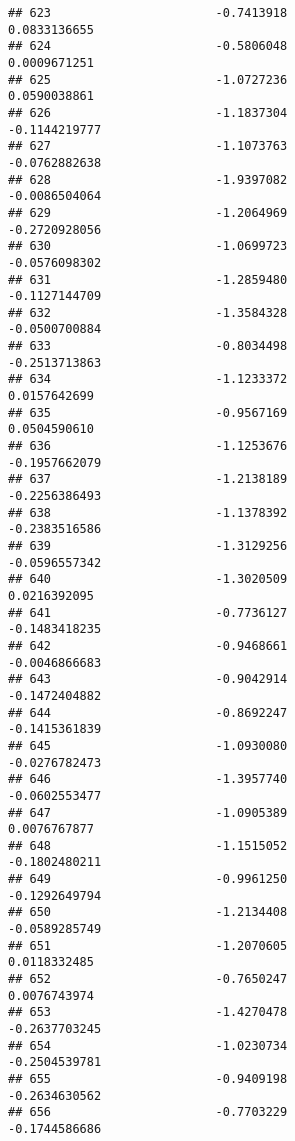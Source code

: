 \documentclass[
]{article}
\begin{document}
\begin{verbatim}
## 623                       -0.7413918                          0.0833136655
## 624                       -0.5806048                          0.0009671251
## 625                       -1.0727236                          0.0590038861
## 626                       -1.1837304                         -0.1144219777
## 627                       -1.1073763                         -0.0762882638
## 628                       -1.9397082                         -0.0086504064
## 629                       -1.2064969                         -0.2720928056
## 630                       -1.0699723                         -0.0576098302
## 631                       -1.2859480                         -0.1127144709
## 632                       -1.3584328                         -0.0500700884
## 633                       -0.8034498                         -0.2513713863
## 634                       -1.1233372                          0.0157642699
## 635                       -0.9567169                          0.0504590610
## 636                       -1.1253676                         -0.1957662079
## 637                       -1.2138189                         -0.2256386493
## 638                       -1.1378392                         -0.2383516586
## 639                       -1.3129256                         -0.0596557342
## 640                       -1.3020509                          0.0216392095
## 641                       -0.7736127                         -0.1483418235
## 642                       -0.9468661                         -0.0046866683
## 643                       -0.9042914                         -0.1472404882
## 644                       -0.8692247                         -0.1415361839
## 645                       -1.0930080                         -0.0276782473
## 646                       -1.3957740                         -0.0602553477
## 647                       -1.0905389                          0.0076767877
## 648                       -1.1515052                         -0.1802480211
## 649                       -0.9961250                         -0.1292649794
## 650                       -1.2134408                         -0.0589285749
## 651                       -1.2070605                          0.0118332485
## 652                       -0.7650247                          0.0076743974
## 653                       -1.4270478                         -0.2637703245
## 654                       -1.0230734                         -0.2504539781
## 655                       -0.9409198                         -0.2634630562
## 656                       -0.7703229                         -0.1744586686

\end{verbatim}
\end{document}
